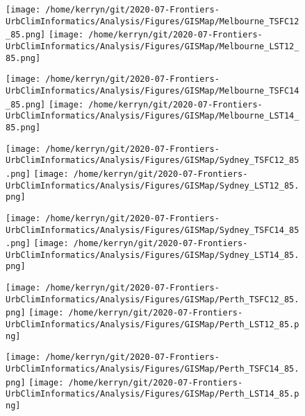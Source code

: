 \documentclass{article}
\begin{document}
\begin{figure}
\centering    
\texttt{[image: /home/kerryn/git/2020-07-Frontiers-UrbClimInformatics/Analysis/Figures/GISMap/Melbourne\_TSFC12\_85.png]}
\texttt{[image: /home/kerryn/git/2020-07-Frontiers-UrbClimInformatics/Analysis/Figures/GISMap/Melbourne\_LST12\_85.png]}
\end{figure} 
\clearpage


\begin{figure}
\centering    
\texttt{[image: /home/kerryn/git/2020-07-Frontiers-UrbClimInformatics/Analysis/Figures/GISMap/Melbourne\_TSFC14\_85.png]}
\texttt{[image: /home/kerryn/git/2020-07-Frontiers-UrbClimInformatics/Analysis/Figures/GISMap/Melbourne\_LST14\_85.png]}
\end{figure} 
\clearpage



\begin{figure}
\centering    
\texttt{[image: /home/kerryn/git/2020-07-Frontiers-UrbClimInformatics/Analysis/Figures/GISMap/Sydney\_TSFC12\_85.png]}
\texttt{[image: /home/kerryn/git/2020-07-Frontiers-UrbClimInformatics/Analysis/Figures/GISMap/Sydney\_LST12\_85.png]}
\end{figure} 
\clearpage


\begin{figure}
\centering    
\texttt{[image: /home/kerryn/git/2020-07-Frontiers-UrbClimInformatics/Analysis/Figures/GISMap/Sydney\_TSFC14\_85.png]}
\texttt{[image: /home/kerryn/git/2020-07-Frontiers-UrbClimInformatics/Analysis/Figures/GISMap/Sydney\_LST14\_85.png]}
\end{figure} 
\clearpage




\begin{figure}
\centering    
\texttt{[image: /home/kerryn/git/2020-07-Frontiers-UrbClimInformatics/Analysis/Figures/GISMap/Perth\_TSFC12\_85.png]}
\texttt{[image: /home/kerryn/git/2020-07-Frontiers-UrbClimInformatics/Analysis/Figures/GISMap/Perth\_LST12\_85.png]}
\end{figure} 
\clearpage


\begin{figure}
\centering    
\texttt{[image: /home/kerryn/git/2020-07-Frontiers-UrbClimInformatics/Analysis/Figures/GISMap/Perth\_TSFC14\_85.png]}
\texttt{[image: /home/kerryn/git/2020-07-Frontiers-UrbClimInformatics/Analysis/Figures/GISMap/Perth\_LST14\_85.png]}
\end{figure} 
\clearpage
\end{document}
